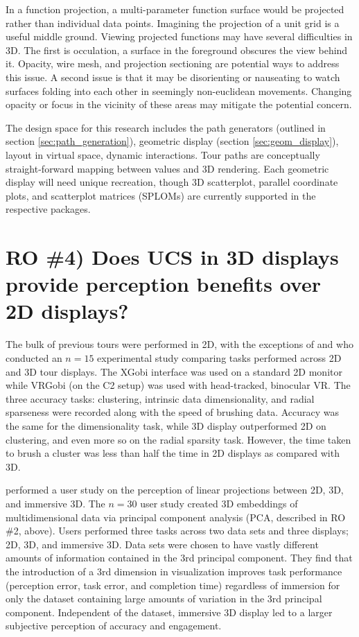 \documentclass{monashthesis}
\begin{document}
In a function projection, a multi-parameter function surface would be
projected rather than individual data points. Imagining the projection
of a unit grid is a useful middle ground. Viewing projected functions
may have several difficulties in 3D. The first is occulation, a surface
in the foreground obscures the view behind it. Opacity, wire mesh, and
projection sectioning \autocite{furnas_prosection_1994} are potential
ways to address this issue. A second issue is that it may be
disorienting or nauseating to watch surfaces folding into each other in
seemingly non-euclidean movements. Changing opacity or focus in the
vicinity of these areas may mitigate the potential concern.

The design space for this research includes the path generators
(outlined in section \ref{sec:path_generation}), geometric display
(section \ref{sec:geom_display}), layout in virtual space, dynamic
interactions. Tour paths are conceptually straight-forward mapping
between values and 3D rendering. Each geometric display will need unique
recreation, though 3D scatterplot, parallel coordinate plots, and
scatterplot matrices (SPLOMs) are currently supported in the respective
packages.

\section{RO \#4) Does UCS in 3D displays provide perception benefits
over 2D displays?}\label{UCS_3dvs2d}

The bulk of previous tours were performed in 2D, with the exceptions of
\textcite{nelson_xgobi_1998} and \textcite{arms_benefits_1999} who
conducted an \(n=15\) experimental study comparing tasks performed
across 2D and 3D tour displays. The XGobi interface was used on a
standard 2D monitor while VRGobi (on the C2 setup) was used with
head-tracked, binocular VR. The three accuracy tasks: clustering,
intrinsic data dimensionality, and radial sparseness were recorded along
with the speed of brushing data. Accuracy was the same for the
dimensionality task, while 3D display outperformed 2D on clustering, and
even more so on the radial sparsity task. However, the time taken to
brush a cluster was less than half the time in 2D displays as compared
with 3D.

\textcite{wagner_filho_immersive_2018} performed a user study on the
perception of linear projections between 2D, 3D, and immersive 3D. The
\(n=30\) user study created 3D embeddings of multidimensional data via
principal component analysis (PCA, described in RO \#2, above). Users
performed three tasks across two data sets and three displays; 2D, 3D,
and immersive 3D. Data sets were chosen to have vastly different amounts
of information contained in the 3rd principal component. They find that
the introduction of a 3rd dimension in visualization improves task
performance (perception error, task error, and completion time)
regardless of immersion for only the dataset containing large amounts of
variation in the 3rd principal component. Independent of the dataset,
immersive 3D display led to a larger subjective perception of accuracy
and engagement.
\end{document}
